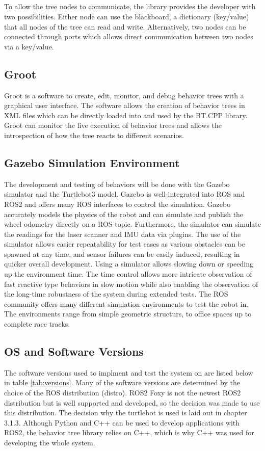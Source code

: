 \subparagraph*{}
To allow the tree nodes to communicate, the library provides the developer with two possibilities. Either node can use the blackboard, a dictionary (key/value) that all nodes of the tree can read and write. Alternatively, two nodes can be connected through ports which allows direct communication between two nodes via a key/value.

\subsection{Groot}

Groot is a software to create, edit, monitor, and debug behavior trees with a graphical user interface. The software allows the creation of behavior trees in XML files which can be directly loaded into and used by the BT.CPP library. Groot can monitor the live execution of behavior trees and allows the introspection of how the tree reacts to different scenarios.


\subsection{Gazebo Simulation Environment}
The development and testing of behaviors will be done with the Gazebo simulator and the Turtlebot3 model. Gazebo is well-integrated into ROS and ROS2 and offers many ROS interfaces to control the simulation. Gazebo accurately models the physics of the robot and can simulate and publish the wheel odometry directly on a ROS topic. Furthermore, the simulator can simulate the readings for the laser scanner and IMU data via plugins. The use of the simulator allows easier repeatability for test cases as various obstacles can be spawned at any time, and sensor failures can be easily induced, resulting in quicker overall development.
Using a simulator allows slowing down or speeding up the environment time. The time control allows more intricate observation of fast reactive type behaviors in slow motion while also enabling the observation of the long-time robustness of the system during extended tests. 
The ROS community offers many different simulation environments to test the robot in. The environments range from simple geometric structurs, to office spaces up to complete race tracks. 

\subsection{OS and Software Versions}
The software versions used to implment and test the system on are listed below in table \ref{tab:versions}. Many of the software versions are determined by the choice of the ROS distribution (distro). ROS2 Foxy is not the newest ROS2 distribution but is well supported and developed, so the decision was made to use this distribution. The decision why the turtlebot is used is laid out in chapter 3.1.3. Although Python and C++ can be used to develop applications with ROS2, the behavior tree library relies on C++, which is why C++ was used for developing the whole system. 

